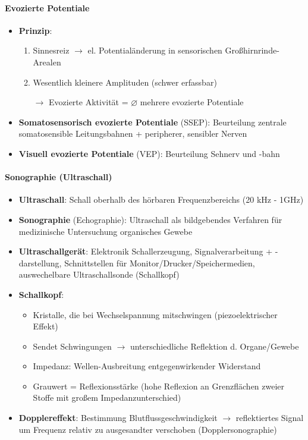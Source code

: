 \paragraph{Evozierte Potentiale}
\begin{itemize}
  \item \textbf{Prinzip}:
  \begin{enumerate}
    \item Sinnesreiz \( \to \) el. Potentialänderung in sensorischen Großhirnrinde-Arealen
    \item Wesentlich kleinere Amplituden (schwer erfassbar)
    \item[\( \to \)] Evozierte Aktivität = \( \varnothing \) mehrere evozierte Potentiale
  \end{enumerate}
  \item \textbf{Somatosensorisch evozierte Potentiale} (SSEP): Beurteilung zentrale somatosensible Leitungsbahnen + peripherer, sensibler Nerven
  \item \textbf{Visuell evozierte Potentiale} (VEP): Beurteilung Sehnerv und -bahn
\end{itemize}

\paragraph{Sonographie (Ultraschall)}
\begin{itemize}
  \item \textbf{Ultraschall}: Schall oberhalb des hörbaren Frequenzbereichs (20 kHz - 1GHz)
  \item \textbf{Sonographie} (Echographie): Ultraschall als bildgebendes Verfahren für medizinische Untersuchung organisches Gewebe
  \item \textbf{Ultraschallgerät}: Elektronik Schallerzeugung, Signalverarbeitung + -dar\-stel\-lung, Schnittstellen für Monitor/Drucker/Speichermedien, auswechelbare Ultraschallsonde (Schallkopf)
  \item \textbf{Schallkopf}:
  \begin{itemize}
    \item Kristalle, die bei Wechselspannung mitschwingen (piezoelektrischer Effekt)
    \item Sendet Schwingungen \( \to \) unterschiedliche Reflektion d. Organe/Gewebe
    \item Impedanz: Wellen-Ausbreitung entgegenwirkender Widerstand
    \item Grauwert = Reflexionsstärke (hohe Reflexion an Grenzflächen zweier Stoffe mit großem Impedanzunterschied)
  \end{itemize}
  \item \textbf{Dopplereffekt}: Bestimmung Blutflussgeschwindigkeit \( \to \) reflektiertes Signal um Frequenz relativ zu ausgesandter verschoben (Dopplersonographie)
\end{itemize}